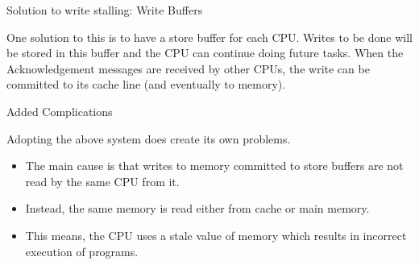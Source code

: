 \documentclass[notes, xcolor = dvipsnames]{beamer}
\begin{document}
    \begin{frame}{Solution to write stalling: Write Buffers}
        
        One solution to this is to have a store buffer for each CPU.
        Writes to be done will be stored in this buffer and the CPU can continue doing future tasks.
        When the Acknowledgement messages are received by other CPUs, the write can be committed to its cache line (and eventually to memory).

        \begin{figure}
        \end{figure}

    \end{frame}

    \begin{frame}{Added Complications}
        
        Adopting the above system does create its own problems. 
        \begin{itemize}
            \item The main cause is that writes to memory committed to store buffers are not read by the same CPU from it.
            \item Instead, the same memory is read either from cache or main memory.
            \item This means, the CPU uses a stale value of memory which results in incorrect execution of programs. 
        \end{itemize}

        \begin{figure}
        \end{figure}

    \end{frame}
\end{document}
